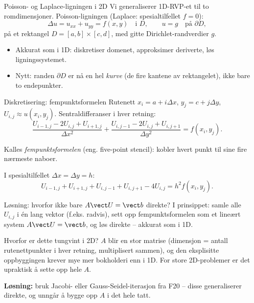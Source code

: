 \documentclass[11pt,aspectratio=169]{beamer}
\begin{document}
\begin{frame}{Poisson- og Laplace-ligningen i 2D}
Vi generaliserer 1D-RVP-et til to romdimensjoner. Poisson-ligningen (Laplace: spesialtilfellet $f=0$):
\[
\Delta u = u_{xx}+u_{yy} = f(x,y) \quad \text{i } D, \qquad u=g \quad \text{på } \partial D,
\]
på et rektangel $D=[a,b]\times[c,d]$, med gitte Dirichlet-randverdier $g$.
\begin{itemize}
\item Akkurat som i 1D: diskretiser domenet, approksimer deriverte, løs ligningssystemet.
\item Nytt: randen $\partial D$ er nå en hel \emph{kurve} (de fire kantene av rektangelet), ikke bare to endepunkter.
\end{itemize}
\end{frame}

\begin{frame}{Diskretisering: fempunktsformelen}
Rutenett $x_i=a+i\Delta x$, $y_j=c+j\Delta y$, $U_{i,j}\approx u(x_i,y_j)$. Sentraldifferanser i hver retning:
\[
\frac{U_{i-1,j}-2U_{i,j}+U_{i+1,j}}{\Delta x^2} + \frac{U_{i,j-1}-2U_{i,j}+U_{i,j+1}}{\Delta y^2} = f(x_i,y_j).
\]
\begin{center}
\end{center}
Kalles \emph{fempunktsformelen} (eng. five-point stencil): kobler hvert punkt til sine fire nærmeste naboer.

I spesialtilfellet $\Delta x=\Delta y=h$:
\begin{equation}
U_{i-1,j}+U_{i+1,j}+U_{i,j-1}+U_{i,j+1} - 4U_{i,j} = h^2f(x_i,y_j).
\end{equation}
\end{frame}

\begin{frame}{Løsning: hvorfor ikke bare $A\vect U=\vect b$ direkte?}
I prinsippet: samle alle $U_{i,j}$ i én lang vektor (f.eks. radvis), sett opp fempunktsformelen som et lineært system $A\vect U=\vect b$, og løs direkte -- akkurat som i 1D.
\begin{remb}{Hvorfor er dette tungvint i 2D?}
$A$ blir en stor matrise (dimensjon = antall rutenettpunkter i hver retning, multiplisert sammen), og den eksplisitte oppbyggingen krever mye mer bokholderi enn i 1D. For store 2D-problemer er det upraktisk å sette opp hele $A$.
\end{remb}
\textbf{Løsning:} bruk Jacobi- eller Gauss-Seidel-iterasjon fra F20 -- disse generaliserer direkte, og unngår å bygge opp $A$ i det hele tatt.
\end{frame}
\end{document}
